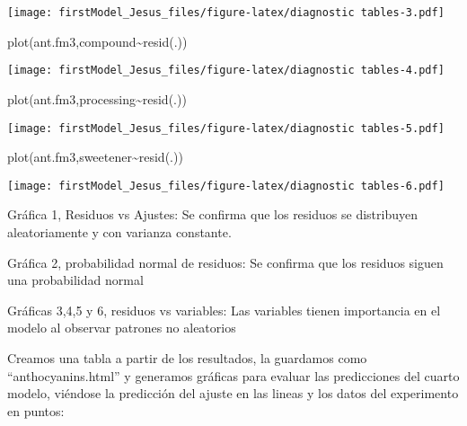 \documentclass[
]{article}
\newenvironment{Shaded}{\begin{snugshade}}{\end{snugshade}}
\newcommand{\FunctionTok}[1]{\textcolor[rgb]{0.00,0.00,0.00}{#1}}
\newcommand{\NormalTok}[1]{#1}
\newcommand{\SpecialCharTok}[1]{\textcolor[rgb]{0.00,0.00,0.00}{#1}}
\begin{document}
\texttt{[image: firstModel\_Jesus\_files/figure-latex/diagnostic tables-3.pdf]}

\begin{Shaded}
\begin{Highlighting}[]
\FunctionTok{plot}\NormalTok{(ant.fm3,compound}\SpecialCharTok{\textasciitilde{}}\FunctionTok{resid}\NormalTok{(.))}
\end{Highlighting}
\end{Shaded}

\texttt{[image: firstModel\_Jesus\_files/figure-latex/diagnostic tables-4.pdf]}

\begin{Shaded}
\begin{Highlighting}[]
\FunctionTok{plot}\NormalTok{(ant.fm3,processing}\SpecialCharTok{\textasciitilde{}}\FunctionTok{resid}\NormalTok{(.))}
\end{Highlighting}
\end{Shaded}

\texttt{[image: firstModel\_Jesus\_files/figure-latex/diagnostic tables-5.pdf]}

\begin{Shaded}
\begin{Highlighting}[]
\FunctionTok{plot}\NormalTok{(ant.fm3,sweetener}\SpecialCharTok{\textasciitilde{}}\FunctionTok{resid}\NormalTok{(.))}
\end{Highlighting}
\end{Shaded}

\texttt{[image: firstModel\_Jesus\_files/figure-latex/diagnostic tables-6.pdf]}

Gráfica 1, Residuos vs Ajustes: Se confirma que los residuos se
distribuyen aleatoriamente y con varianza constante.

Gráfica 2, probabilidad normal de residuos: Se confirma que los residuos
siguen una probabilidad normal

Gráficas 3,4,5 y 6, residuos vs variables: Las variables tienen
importancia en el modelo al observar patrones no aleatorios

Creamos una tabla a partir de los resultados, la guardamos como
``anthocyanins.html'' y generamos gráficas para evaluar las predicciones
del cuarto modelo, viéndose la predicción del ajuste en las lineas y los
datos del experimento en puntos:
\end{document}
